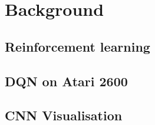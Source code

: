 \chapter{Background}
\label{cha:bg}

\section{Reinforcement learning}
\label{bg:sec:rl}

\section{DQN on Atari 2600}
\label{bg:sec:dqn}

\section{CNN Visualisation}
\label{bg:sec:cnn-vis}